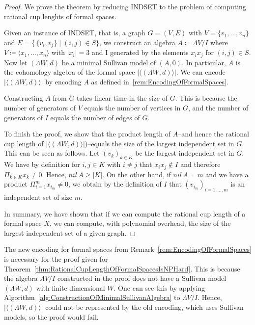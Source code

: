 \begin{proof}
 We  prove the theorem by reducing  INDSET to the problem of computing rational cup lenghts of formal spaces. 
 
 Given an instance of INDSET, that is, a graph $G = (V,E)$ with $V = \lbrace v_1 , \ldots , v_n \rbrace$ and 
 $E = \lbrace \, \lbrace v_i, v_j \rbrace \; | \; (i,j) \in S \rbrace$, we construct an algebra 
 $A \coloneqq \Lambda V /I$ where $V \coloneqq \langle x_1, \ldots , x_n \rangle$ with $|x_i| = 3$ and I generated by
 the elements $x_i x_j$ for $(i,j) \in S$. Now let $(\Lambda W,d)$ be a minimal Sullivan model of $(A,0)$. In particular,
 $A$ is  the cohomology algebra of the formal space $ | \langle (\Lambda W,d) \rangle | $. 
 We can encode $| \langle (\Lambda W,d) \rangle |$ by encoding $A$ as defined in~\ref{rem:EncodingOfFormalSpaces}.
 
 Constructing $A$ from $G$ takes linear time in the size of $G$.
 This is because the number of generators of $V$ equals the number of vertices in $G$, 
 and the number of generators of $I$ equals the number of edges of $G$. 
 
 To finish the proof, we show that the product length of $A$--and hence the rational cup length of 
 $| \langle (\Lambda W,d) \rangle | $)--equals the size of the largest
 independent set in $G$. This can be seen as follows.
 Let $(v_k)_{k \in K}$ be the largest independent set in $G$. We have by definition for $i,j \in K$ with  $i\neq j$
 that $x_i x_j \notin I$ and therefore $\Pi_{k \in K} x_k \neq 0$. Hence, $nil \, A \geq |K|$. On the other hand,
 if $nil \, A = m$ and we have a product  $\Pi_{i = 1}^m x_{i_m} \neq 0$, we obtain by the definition of $I$ that 
 $(v_{i_m})_{i = 1, \ldots, m}$ is an independent set of size $m$. 
 
 In summary, we have shown that if we can compute
 the rational cup length of a formal space $X$, we can compute, with polynomial overhead, the size of the largest
 independent set of a given graph.
 
\end{proof}

\begin{Remark}
 The new encoding for formal spaces from Remark~\ref{rem:EncodingOfFormalSpaces} is necessary for the proof given 
 for Theorem~\ref{thm:RationalCupLengthOfFormalSpacesIsNPHard}. This is because the algebra $\Lambda V /I$ constructed
 in the proof does not have a Sullivan model $(\Lambda W, d)$ with finite dimensional $W$. One can see
 this by applying Algorithm~\ref{alg:ConstructionOfMinimalSullivanAlgebra} to $\Lambda V /I$.
 Hence, $ | \langle (\Lambda W,d) \rangle | $ could not be represented by the old encoding, which uses Sullivan models,
 so the proof would fail.
\end{Remark}
